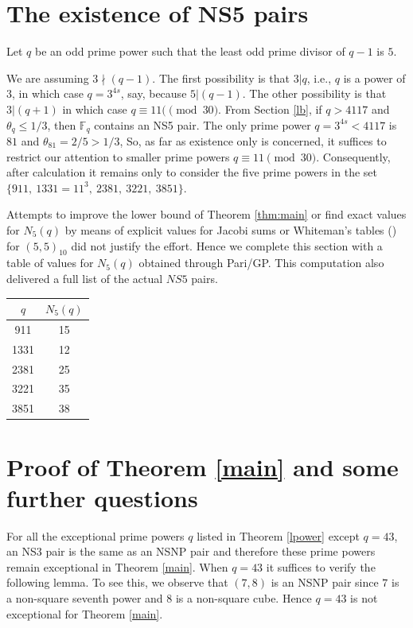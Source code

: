 \documentclass[12pt]{amsart}
\numberwithin{equation}{section}
\newcommand{\F}{\mathbb{F}_q}
\begin{document}
 
 \FloatBarrier
 \bigskip 
 \section{The existence of NS5 pairs}

Let $q$ be an odd prime power such that the least odd prime divisor of $q-1$ is $5$.  

We are assuming $3\nmid (q-1)$.  The first possibility is that $3|q$, i.e., $q$ is a power of $3$, in which case $q=3^{4s}$, say, because $5|(q-1)$.  The other possibility is that $3|(q+1)$ in which case $q \equiv 11 (\pmod{30}$.  From Section \ref{lb}, if $q>4117$ and $\theta_q \le 1/3$, then $\F$ contains an NS5 pair.   The only prime power $q=3^{4s}< 4117$ is $81$ and $\theta_{81}  =2/5>1/3$,  So, as far as existence only is concerned, it suffices to restrict our attention to smaller prime powers $q\equiv 11 \pmod{30}$. Consequently, after calculation it remains only to consider  the five  prime powers in the set $\{911,\ 1331=11^3,\ 2381,\ 3221,\ 3851\}$.

Attempts to improve the lower bound of Theorem \ref{thm:main}  or find exact values for $N_5(q)$ by means of explicit values for Jacobi sums or Whiteman's tables (\cite{Whi1960a}) for $(5,5)_{10}$ did not justify the effort. Hence we complete this section with a table of values for $N_5(q)$ obtained through Pari/GP. This computation also delivered a full list of the actual $NS5$ pairs.

  \begin{table}[h]
\centering
\begin{tabular}{c|c}
\hline
$q$ & $N_5(q)$ \\
\hline
911  & 15 \\
1331 & 12 \\
2381 & 25 \\
3221 & 35 \\
3851 & 38 \\
\hline
\end{tabular}
\end{table}

\bigskip
\section{Proof of Theorem \ref{main} and some further questions}
For all the exceptional prime powers $q$ listed in Theorem \ref{lpower} except $q=43$, an NS3 pair is the same as an NSNP pair and therefore these prime powers remain exceptional in Theorem \ref{main}.   When $q=43$  it suffices to verify the following lemma.  To see this, we observe that $(7,8)$ is an NSNP pair since $7$ is a non-square seventh power and $8$ is a non-square cube. Hence $q=43$ is not exceptional for Theorem \ref{main}.
\end{document}

